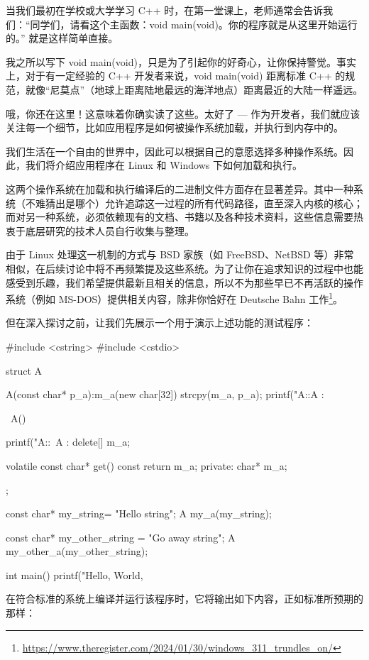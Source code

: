 
当我们最初在学校或大学学习 C++ 时，在第一堂课上，老师通常会告诉我们：“同学们，请看这个主函数：void main(void)。你的程序就是从这里开始运行的。” 就是这样简单直接。

我之所以写下 void main(void)，只是为了引起你的好奇心，让你保持警觉。事实上，对于有一定经验的 C++ 开发者来说，void main(void) 距离标准 C++ 的规范，就像“尼莫点”（地球上距离陆地最远的海洋地点）距离最近的大陆一样遥远。

哦，你还在这里！这意味着你确实读了这些。太好了 --- 作为开发者，我们就应该关注每一个细节，比如应用程序是如何被操作系统加载，并执行到内存中的。

我们生活在一个自由的世界中，因此可以根据自己的意愿选择多种操作系统。因此，我们将介绍应用程序在 Linux 和 Windows 下如何加载和执行。

这两个操作系统在加载和执行编译后的二进制文件方面存在显著差异。其中一种系统（不难猜出是哪个）允许追踪这一过程的所有代码路径，直至深入内核的核心；而对另一种系统，必须依赖现有的文档、书籍以及各种技术资料，这些信息需要热衷于底层研究的技术人员自行收集与整理。

由于 Linux 处理这一机制的方式与 BSD 家族（如 FreeBSD、NetBSD 等）非常相似，在后续讨论中将不再频繁提及这些系统。为了让你在追求知识的过程中也能感受到乐趣，我们希望提供最新且相关的信息，所以不为那些早已不再活跃的操作系统（例如 MS-DOS）提供相关内容，除非你恰好在 Deutsche Bahn 工作\footnote{\url{https://www.theregister.com/2024/01/30/windows_311_trundles_on/}}。

但在深入探讨之前，让我们先展示一个用于演示上述功能的测试程序：

\begin{cpp}
#include <cstring>
#include <cstdio>

struct A {
  A(const char* p_a):m_a(new char[32]) { strcpy(m_a, p_a);
    printf("A::A : %
  }

  ~A() {

  printf("A::~A : %
    delete[] m_a;
  }

  volatile const char* get() const {return m_a;}
private:
  char* m_a;
};

const char* my_string= "Hello string";
A my_a(my_string);

const char* my_other_string = "Go away string";
A my_other_a(my_other_string);

int main() {
  printf("Hello, World, %
}
\end{cpp}

在符合标准的系统上编译并运行该程序时，它将输出如下内容，正如标准所预期的那样：

